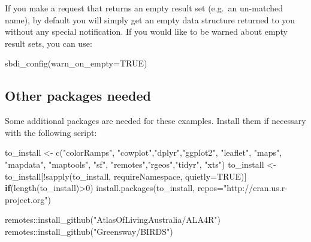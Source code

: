 \documentclass[
  10pt,
]{article}
\newenvironment{Shaded}{\begin{snugshade}}{\end{snugshade}}
\newcommand{\AttributeTok}[1]{\textcolor[rgb]{0.77,0.63,0.00}{#1}}
\newcommand{\ConstantTok}[1]{\textcolor[rgb]{0.00,0.00,0.00}{#1}}
\newcommand{\ControlFlowTok}[1]{\textcolor[rgb]{0.13,0.29,0.53}{\textbf{#1}}}
\newcommand{\DecValTok}[1]{\textcolor[rgb]{0.00,0.00,0.81}{#1}}
\newcommand{\FunctionTok}[1]{\textcolor[rgb]{0.00,0.00,0.00}{#1}}
\newcommand{\NormalTok}[1]{#1}
\newcommand{\OtherTok}[1]{\textcolor[rgb]{0.56,0.35,0.01}{#1}}
\newcommand{\SpecialCharTok}[1]{\textcolor[rgb]{0.00,0.00,0.00}{#1}}
\newcommand{\StringTok}[1]{\textcolor[rgb]{0.31,0.60,0.02}{#1}}
\begin{document}
If you make a request that returns an empty result set (e.g.~an un-matched name), by default you will simply get an empty data structure returned to you without any special notification. If you would like to be warned about empty result sets, you can use:

\begin{Shaded}
\begin{Highlighting}[]
\FunctionTok{sbdi\_config}\NormalTok{(}\AttributeTok{warn\_on\_empty=}\ConstantTok{TRUE}\NormalTok{)}
\end{Highlighting}
\end{Shaded}

\hypertarget{other-packages-needed}{%
\subsection*{Other packages needed}\label{other-packages-needed}}

Some additional packages are needed for these examples. Install them if necessary with the following script:

\begin{Shaded}
\begin{Highlighting}[]
\NormalTok{to\_install }\OtherTok{\textless{}{-}} \FunctionTok{c}\NormalTok{(}\StringTok{"colorRamps"}\NormalTok{, }\StringTok{"cowplot"}\NormalTok{,}\StringTok{"dplyr"}\NormalTok{,}\StringTok{"ggplot2"}\NormalTok{, }
                \StringTok{"leaflet"}\NormalTok{, }\StringTok{"maps"}\NormalTok{, }\StringTok{"mapdata"}\NormalTok{, }\StringTok{"maptools"}\NormalTok{, }\StringTok{"sf"}\NormalTok{, }
                \StringTok{"remotes"}\NormalTok{,}\StringTok{"rgeos"}\NormalTok{,}\StringTok{"tidyr"}\NormalTok{, }\StringTok{"xts"}\NormalTok{)}
\NormalTok{to\_install }\OtherTok{\textless{}{-}}\NormalTok{ to\_install[}\SpecialCharTok{!}\FunctionTok{sapply}\NormalTok{(to\_install, }
\NormalTok{                                 requireNamespace, }
                                 \AttributeTok{quietly=}\ConstantTok{TRUE}\NormalTok{)]}
\ControlFlowTok{if}\NormalTok{(}\FunctionTok{length}\NormalTok{(to\_install)}\SpecialCharTok{\textgreater{}}\DecValTok{0}\NormalTok{)}
    \FunctionTok{install.packages}\NormalTok{(to\_install, }
                     \AttributeTok{repos=}\StringTok{"http://cran.us.r{-}project.org"}\NormalTok{)}

\NormalTok{remotes}\SpecialCharTok{::}\FunctionTok{install\_github}\NormalTok{(}\StringTok{"AtlasOfLivingAustralia/ALA4R"}\NormalTok{)}
\NormalTok{remotes}\SpecialCharTok{::}\FunctionTok{install\_github}\NormalTok{(}\StringTok{"Greensway/BIRDS"}\NormalTok{)}
\end{Highlighting}
\end{Shaded}
\end{document}
